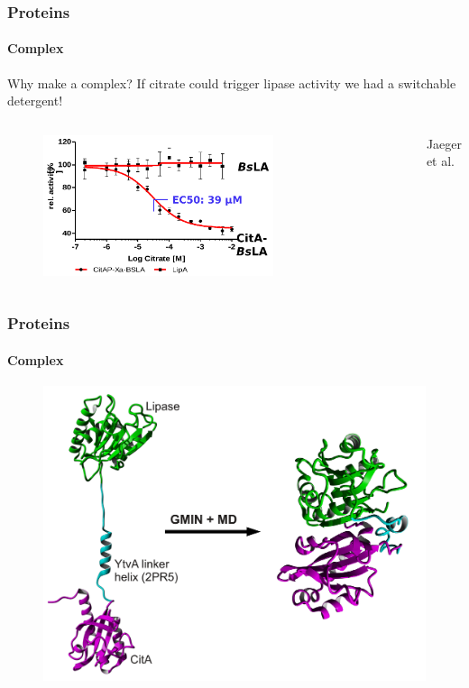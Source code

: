 \documentclass[english]{beamer}
\begin{document}

\begin{frame}
    \frametitle{Proteins}
    \framesubtitle{Complex}


    \begin{block}{Why make a complex?}
        If citrate could trigger lipase activity we had a switchable detergent!
    \end{block}

    \pause

    \begin{columns}[t]
        \vspace{-3ex}
        \begin{figure}
            \includegraphics[width=0.7\textwidth]{figures/BSLA_activity/BSLA_activity.png}
        \end{figure}       
        \vfill

        \tiny
        Jaeger et al.
    \end{columns}

\end{frame}  


\begin{frame}
    \frametitle{Proteins}
    \framesubtitle{Complex}

    \begin{figure}
        \includegraphics[width=.9\linewidth]{figures/complex/complex_folding.pdf}
    \end{figure}       

\end{frame}   
\end{document}
